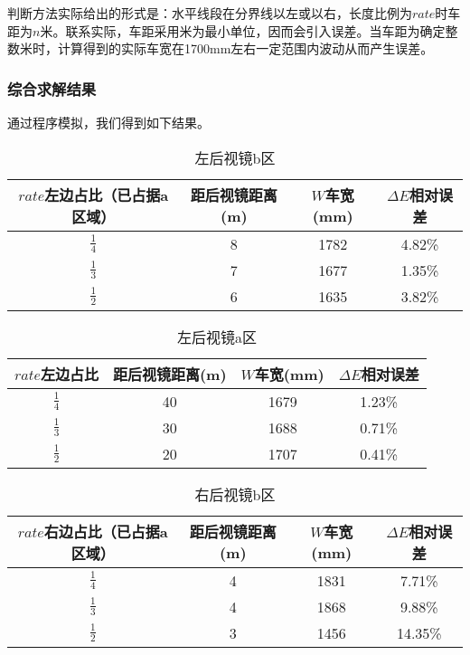\documentclass[withoutpreface,bwprint]{cumcmthesis} %
\begin{document}
\par 判断方法实际给出的形式是：水平线段在分界线以左或以右，长度比例为$rate$时车距为$n$米。联系实际，车距采用米为最小单位，因而会引入误差。当车距为确定整数米时，计算得到的实际车宽在1700mm左右一定范围内波动从而产生误差。

\subsubsection{综合求解结果}

通过程序模拟，我们得到如下结果。

\begin{table}[!htbp]
\centering
\caption{左后视镜b区}
\label{左后视镜b区}
\begin{tabular}{cccc}
\toprule
 $rate$左边占比（已占据a区域）  &  距后视镜距离(m) &  $W$车宽(mm) &  $\Delta E$相对误差  \\ \midrule
$\frac{1}{4}$ & 8 & 1782 & 4.82\% \\
$\frac{1}{3}$ & 7 & 1677 & 1.35\% \\
$\frac{1}{2}$ & 6 & 1635 & 3.82\% \\
\bottomrule 
\end{tabular}
\end{table}

\begin{table}[!htbp]
\centering
\caption{左后视镜a区}
\label{左后视镜a区}
\begin{tabular}{cccc}
\toprule
$rate$左边占比 & 距后视镜距离(m) & $W$车宽(mm) & $\Delta E$相对误差  \\ \midrule
$\frac{1}{4}$ & 40 & 1679 & 1.23\% \\
$\frac{1}{3}$ & 30 & 1688 & 0.71\% \\
$\frac{1}{2}$ & 20 & 1707 & 0.41\% \\
\bottomrule 
\end{tabular}
\end{table}

\begin{table}[!htbp]
\centering
\caption{右后视镜b区}
\label{右后视镜b区}
\begin{tabular}{cccc}
\toprule
$rate$右边占比（已占据a区域）& 距后视镜距离(m) & $W$车宽(mm) & $\Delta E$相对误差  \\ \midrule
$\frac{1}{4}$ & 4 & 1831 & 7.71\% \\
$\frac{1}{3}$ & 4 & 1868 & 9.88\% \\
$\frac{1}{2}$ & 3 & 1456 & 14.35\% \\
\bottomrule 
\end{tabular}
\end{table}
\end{document}
